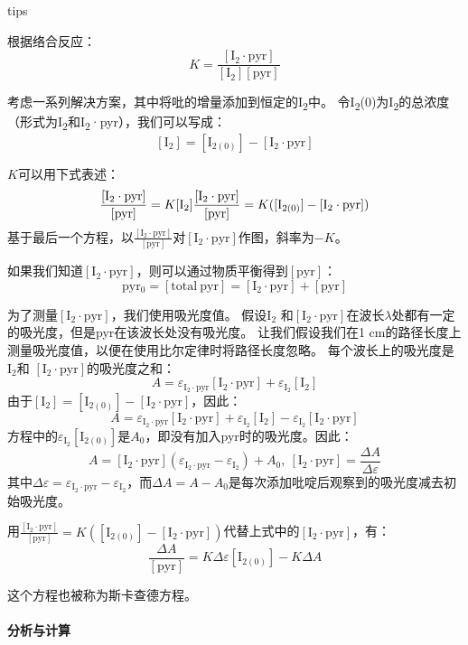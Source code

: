 tips

根据络合反应： \[
K=\frac{[\mathrm{I_2\cdot pyr}]}{[\mathrm{I_2}][\mathrm{pyr}]}
\] 

考虑一系列解决方案，其中将吡的增量添加到恒定的I\textsubscript{2}中。
令I\textsubscript{2}(0)为I\textsubscript{2}的总浓度（形式为I\textsubscript{2}和I\textsubscript{2}·pyr），我们可以写成：
\[
\mathrm{[I_2]=[I_{2(0)}]-[I_2\cdot pyr]}
\] 

\(K\)可以用下式表述： \[
\frac{[\mathrm{I_2\cdot pyr}]}{[\mathrm{pyr}]}=K[\mathrm{I_2}]\\
\frac{[\mathrm{I_2\cdot pyr}]}{[\mathrm{pyr}]}=K(\mathrm{[I_{2(0)}]-[I_2\cdot pyr]})
\]基于最后一个方程，以\(\frac{[\mathrm{I_2\cdot pyr}]}{[\mathrm{pyr}]}\)对\(\mathrm{[I_2\cdot pyr]}\)作图，斜率为\(-K\)。

如果我们知道\([\mathrm{I_2\cdot pyr}]\)，则可以通过物质平衡得到\([\mathrm{pyr}]\)：
\[
\mathrm{pyr_0=[total\ pyr]=[I_2\cdot pyr]+[pyr]}
\] 

为了测量\([\mathrm{I_2\cdot pyr}]\)，我们使用吸光度值。
假设\(\mathrm{I_2}\)
和\(\mathrm{[I_2\cdot pyr]}\)在波长\(\lambda\)处都有一定的吸光度，但是pyr在该波长处没有吸光度。
让我们假设我们在1
cm的路径长度上测量吸光度值，以便在使用比尔定律时将路径长度忽略。
每个波长上的吸光度是\(\mathrm{I_2}\)和
\(\mathrm{[I_2\cdot pyr]}\)的吸光度之和： \[
A=\varepsilon_{\mathrm{I_2\cdot pyr}}[\mathrm{I_2\cdot pyr}]+\varepsilon_{\mathrm{I_2}}[\mathrm{I_2}]
\] 由于\(\mathrm{[I_2]=[I_{2(0)}]-[I_2\cdot pyr]}\)，因此： \[
A=\varepsilon_{\mathrm{I_2\cdot pyr}}[\mathrm{I_2\cdot pyr}]+\varepsilon_{\mathrm{I_2}}[\mathrm{I_2}]-\varepsilon_{\mathrm{I_2}}[\mathrm{I_2\cdot pyr}]
\]
方程中的\(\varepsilon_{\mathrm{I_2}}[\mathrm{I_{2(0)}}]\)是\(A_0\)，即没有加入pyr时的吸光度。因此：
\[
A=[\mathrm{I_2\cdot pyr}](\varepsilon_{\mathrm{I_2\cdot pyr}}-\varepsilon_{\mathrm{I_2}})+A_0,\ [\mathrm{I_2\cdot pyr}]=\frac{\Delta A}{\Delta\varepsilon}
\]
其中\(\Delta\varepsilon=\varepsilon_{\mathrm{I_2\cdot pyr}}-\varepsilon_{\mathrm{I_2}}\)，而\(\Delta A=A-A_0\)是每次添加吡啶后观察到的吸光度减去初始吸光度。

用\(\frac{[\mathrm{I_2\cdot pyr}]}{[\mathrm{pyr}]}=K(\mathrm{[I_{2(0)}]-[I_2\cdot pyr]})\)代替上式中的\([\mathrm{I_2\cdot pyr}]\)，有：
\[
\frac{\Delta A}{[\mathrm{pyr}]}=K\Delta\varepsilon[\mathrm{I_{2(0)}}]-K\Delta A
\] 

这个方程也被称为斯卡查德方程。

\paragraph{分析与计算}


